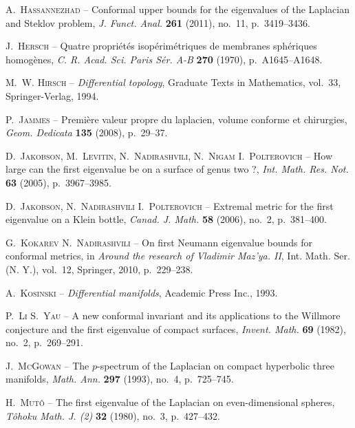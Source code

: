 \documentclass[11pt,a4paper]{smfart}
\begin{document}
\begin{thebibliography}{{Mc}{G}93}
{\scshape A.~Hassannezhad} -- {\og Conformal upper bounds for the eigenvalues
  of the {L}aplacian and {S}teklov problem\fg}, \emph{J. Funct. Anal.}
  \textbf{261} (2011), no.~11, p.~3419--3436.

{\scshape J.~Hersch} -- {\og Quatre propri\'et\'es isop\'erim\'etriques de
  membranes sph\'eriques homog\`enes\fg}, \emph{C. R. Acad. Sci. Paris S\'er.
  A-B} \textbf{270} (1970), p.~A1645--A1648.

{\scshape M.~W. Hirsch} -- \emph{Differential topology}, Graduate Texts in
  Mathematics, vol.~33, Springer-Verlag, 1994.

{\scshape P.~Jammes} -- {\og Premi\`ere valeur propre du laplacien, volume
  conforme et chirurgies\fg}, \emph{Geom. Dedicata} \textbf{135} (2008),
  p.~29--37.

{\scshape D.~Jakobson, M.~Levitin, N.~Nadirashvili, N.~Nigam {\normalfont
  \smfandname} I.~Polterovich} -- {\og How large can the first eigenvalue be on
  a surface of genus two ?\fg}, \emph{Int. Math. Res. Not.} \textbf{63} (2005),
  p.~3967--3985.

{\scshape D.~Jakobson, N.~Nadirashvili {\normalfont \smfandname}
  I.~Polterovich} -- {\og Extremal metric for the first eigenvalue on a {K}lein
  bottle\fg}, \emph{Canad. J. Math.} \textbf{58} (2006), no.~2, p.~381--400.

{\scshape G.~Kokarev {\normalfont \smfandname} N.~Nadirashvili} -- {\og On
  first {N}eumann eigenvalue bounds for conformal metrics\fg}, in \emph{Around
  the research of {V}ladimir {M}az'ya. {II}}, Int. Math. Ser. (N. Y.), vol.~12,
  Springer, 2010, p.~229--238.

{\scshape A.~Kosinski} -- \emph{Differential manifolds}, Academic Press Inc.,
  1993.

{\scshape P.~Li {\normalfont \smfandname} S.~Yau} -- {\og A new conformal
  invariant and its applications to the {W}illmore conjecture and the first
  eigenvalue of compact surfaces\fg}, \emph{Invent. Math.} \textbf{69} (1982),
  no.~2, p.~269--291.

{\scshape J.~{Mc}{Gowan}} -- {\og The $p$-spectrum of the {L}aplacian on
  compact hyperbolic three manifolds\fg}, \emph{Math. Ann.} \textbf{297}
  (1993), no.~4, p.~725--745.

{\scshape H.~Mut\^o} -- {\og The first eigenvalue of the {L}aplacian on
  even-dimensional spheres\fg}, \emph{T\^ohoku Math. J. (2)} \textbf{32}
  (1980), no.~3, p.~427--432.


\end{thebibliography}
\end{document}
